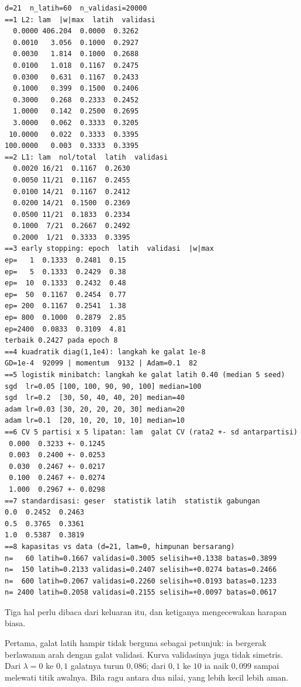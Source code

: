 \begin{verbatim}
d=21  n_latih=60  n_validasi=20000
==1 L2: lam  |w|max  latih  validasi
  0.0000 406.204  0.0000  0.3262
  0.0010   3.056  0.1000  0.2927
  0.0030   1.814  0.1000  0.2688
  0.0100   1.018  0.1167  0.2475
  0.0300   0.631  0.1167  0.2433
  0.1000   0.399  0.1500  0.2406
  0.3000   0.268  0.2333  0.2452
  1.0000   0.142  0.2500  0.2695
  3.0000   0.062  0.3333  0.3205
 10.0000   0.022  0.3333  0.3395
100.0000   0.003  0.3333  0.3395
==2 L1: lam  nol/total  latih  validasi
  0.0020 16/21  0.1167  0.2630
  0.0050 11/21  0.1167  0.2455
  0.0100 14/21  0.1167  0.2412
  0.0200 14/21  0.1500  0.2369
  0.0500 11/21  0.1833  0.2334
  0.1000  7/21  0.2667  0.2492
  0.2000  1/21  0.3333  0.3395
==3 early stopping: epoch  latih  validasi  |w|max
ep=   1  0.1333  0.2481  0.15
ep=   5  0.1333  0.2429  0.38
ep=  10  0.1333  0.2432  0.48
ep=  50  0.1167  0.2454  0.77
ep= 200  0.1167  0.2541  1.38
ep= 800  0.1000  0.2879  2.85
ep=2400  0.0833  0.3109  4.81
terbaik 0.2427 pada epoch 8
==4 kuadratik diag(1,1e4): langkah ke galat 1e-8
GD=1e-4  92099 | momentum  9132 | Adam=0.1  82
==5 logistik minibatch: langkah ke galat latih 0.40 (median 5 seed)
sgd  lr=0.05 [100, 100, 90, 90, 100] median=100
sgd  lr=0.2  [30, 50, 40, 40, 20] median=40
adam lr=0.03 [30, 20, 20, 20, 30] median=20
adam lr=0.1  [20, 10, 20, 10, 10] median=10
==6 CV 5 partisi x 5 lipatan: lam  galat CV (rata2 +- sd antarpartisi)
 0.000  0.3233 +- 0.1245
 0.003  0.2400 +- 0.0253
 0.030  0.2467 +- 0.0217
 0.100  0.2467 +- 0.0274
 1.000  0.2967 +- 0.0298
==7 standardisasi: geser  statistik latih  statistik gabungan
0.0  0.2452  0.2463
0.5  0.3765  0.3361
1.0  0.5387  0.3819
==8 kapasitas vs data (d=21, lam=0, himpunan bersarang)
n=   60 latih=0.1667 validasi=0.3005 selisih=+0.1338 batas=0.3899
n=  150 latih=0.2133 validasi=0.2407 selisih=+0.0274 batas=0.2466
n=  600 latih=0.2067 validasi=0.2260 selisih=+0.0193 batas=0.1233
n= 2400 latih=0.2058 validasi=0.2155 selisih=+0.0097 batas=0.0617
\end{verbatim}

Tiga hal perlu dibaca dari keluaran itu, dan ketiganya mengecewakan harapan biasa.

Pertama, galat latih hampir tidak berguna sebagai petunjuk: ia bergerak berlawanan arah
dengan galat validasi. Kurva validasinya juga tidak simetris. Dari $\lambda=0$ ke
$0{,}1$ galatnya turun $0{,}086$; dari $0{,}1$ ke $10$ ia naik $0{,}099$ sampai melewati
titik awalnya. Bila ragu antara dua nilai, yang lebih kecil lebih aman.

